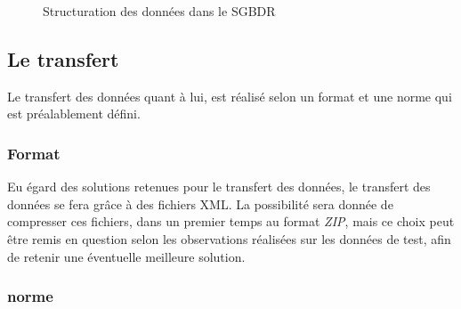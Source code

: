 \begin{figure}[htbp]
	\caption{Structuration des données dans le SGBDR}
	\label{DonneesStructurationSgbdr}
\end{figure}


\subsection{Le transfert}
Le transfert des données quant à lui, est réalisé selon un format et une norme qui est préalablement défini.

\subsubsection{Format}
Eu égard des solutions retenues pour le transfert des données, le transfert des données se fera grâce à des fichiers XML.
La possibilité sera donnée de compresser ces fichiers, dans un premier temps au format \emph{ZIP}, mais ce choix peut être remis en question selon les observations réalisées sur les données de test, afin de retenir une éventuelle meilleure solution.

\subsubsection{norme}
% 
% 

